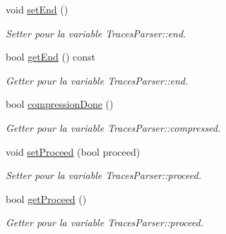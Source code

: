 \begin{DoxyCompactItemize}
void \hyperlink{class_traces_parser_adafdd12df08a028854ac2bb52d1e610f}{set\+End} ()
\begin{DoxyCompactList}\small\item\em Setter pour la variable Traces\+Parser\+::end. \end{DoxyCompactList}\item 
bool \hyperlink{class_traces_parser_a6f0cc2b49ed08edeb987d088c1ec5320}{get\+End} () const 
\begin{DoxyCompactList}\small\item\em Getter pour la variable Traces\+Parser\+::end. \end{DoxyCompactList}\item 
bool \hyperlink{class_traces_parser_a4b35fa08af68c2b1b93e0eaef75c7a86}{compression\+Done} ()
\begin{DoxyCompactList}\small\item\em Getter pour la variable Traces\+Parser\+::compressed. \end{DoxyCompactList}\item 
void \hyperlink{class_traces_parser_ad5ef57948524c0c85eea22615491c47f}{set\+Proceed} (bool proceed)
\begin{DoxyCompactList}\small\item\em Setter pour la variable Traces\+Parser\+::proceed. \end{DoxyCompactList}\item 
bool \hyperlink{class_traces_parser_a093f9b0e30ee770ae45bf66c3bcf5de2}{get\+Proceed} ()
\begin{DoxyCompactList}\small\item\em Getter pour la variable Traces\+Parser\+::proceed. \end{DoxyCompactList}\end{DoxyCompactItemize}
